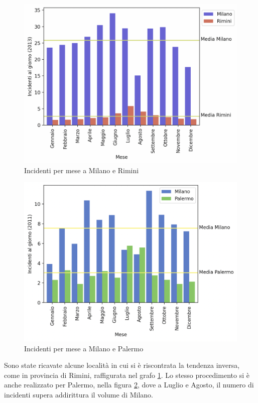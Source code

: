 \documentclass[a4paper]{report}
\begin{document}
\begin{figure}
    \includegraphics[width=\linewidth]{../src/incidenti/incidenti_senza_coords/mese_incidenti/milano_rimini.png}
    \caption{Incidenti per mese a Milano e Rimini}
    \label{fig:milano-rimini}
\end{figure}

\begin{figure}
    \includegraphics[width=\linewidth]{../src/incidenti/incidenti_senza_coords/mese_incidenti/palermo_milano.png}
    \caption{Incidenti per mese a Milano e Palermo}
    \label{fig:palermo-milano}
\end{figure}

Sono state ricavate alcune località in cui si è riscontrata la tendenza inversa, come in provincia 
di Rimini, raffigurata nel grafo \ref{fig:milano-rimini}.
Lo stesso procedimento si è anche realizzato per Palermo, nella figura \ref{fig:palermo-milano}, 
dove a Luglio e Agosto, il numero di incidenti supera addirittura il volume di Milano.
\end{document}
